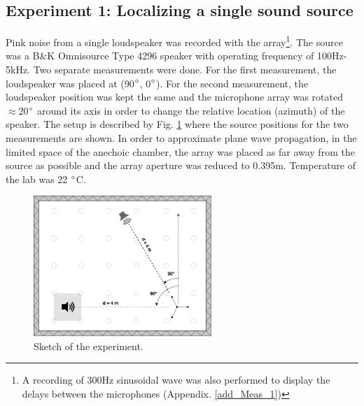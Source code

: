\subsection{Experiment 1: Localizing a single sound source}
Pink noise from a single loudspeaker was recorded with the array\footnote{A recording of 300Hz sinusoidal wave was also performed to display the delays between the microphones (Appendix. \ref{add_Meas_1})}. The source was a B\&K Omnisource Type 4296 speaker with operating frequency of 100Hz-5kHz. Two separate measurements were done. For the first measurement, the loudspeaker was placed at (90$\degree$, 0$\degree$). For the second measurement, the loudspeaker position was kept the same and the microphone array was rotated $\approx$20$\degree$ around its axis in order to change the relative location (azimuth) of the speaker. The setup is described by Fig. \ref{fig:Anechoic1} where the source positions for the two measurements are shown. In order to approximate plane wave propagation, in the limited space of the anechoic chamber, the array was placed as far away from the source as possible and the array aperture was reduced to 0.395m. Temperature of the lab was 22 $\degree$C.
\begin{figure}[H]
    \centering
    \includegraphics[width=0.6\textwidth]{Figures/Anechoicexp1.png}
    \caption{Sketch of the experiment.}
    \label{fig:Anechoic1}
\end{figure}

